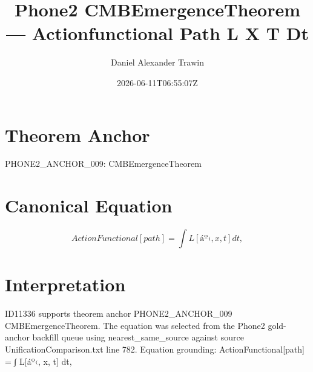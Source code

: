 \documentclass[11pt]{article}
\title{Phone2 CMBEmergenceTheorem — Actionfunctional Path L X T Dt}
\author{Daniel Alexander Trawin}
\date{2026-06-11T06:55:07Z}
\begin{document}
\maketitle
\section*{Theorem Anchor}
PHONE2_ANCHOR_009: CMBEmergenceTheorem
\section*{Canonical Equation}
\[
ActionFunctional[path] = ∫ L[áº‹, x, t] dt,
\]
\section*{Interpretation}
ID11336 supports theorem anchor PHONE2_ANCHOR_009 CMBEmergenceTheorem. The equation was selected from the Phone2 gold-anchor backfill queue using nearest_same_source against source UnificationComparison.txt line 782. Equation grounding: ActionFunctional[path] = ∫ L[áº‹, x, t] dt,
\end{document}
